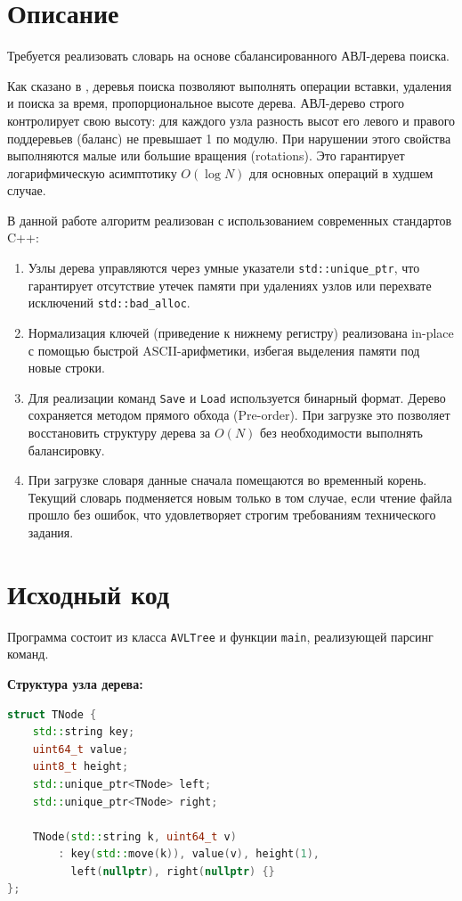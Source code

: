 \section{Описание}
Требуется реализовать словарь на основе сбалансированного АВЛ-дерева поиска. 

Как сказано в \cite{Kormen}, деревья поиска позволяют выполнять операции вставки, удаления и поиска за время, пропорциональное высоте дерева. АВЛ-дерево строго контролирует свою высоту: для каждого узла разность высот его левого и правого поддеревьев (баланс) не превышает 1 по модулю. При нарушении этого свойства выполняются малые или большие вращения (rotations). Это гарантирует логарифмическую асимптотику $O(\log N)$ для основных операций в худшем случае.

В данной работе алгоритм реализован с использованием современных стандартов C++:
\begin{enumerate}
\item Узлы дерева управляются через умные указатели \texttt{std::unique\_ptr}, что гарантирует отсутствие утечек памяти при удалениях узлов или перехвате исключений \texttt{std::bad\_alloc}.
\item Нормализация ключей (приведение к нижнему регистру) реализована in-place с помощью быстрой ASCII-арифметики, избегая выделения памяти под новые строки.
\item Для реализации команд \texttt{Save} и \texttt{Load} используется бинарный формат. Дерево сохраняется методом прямого обхода (Pre-order). При загрузке это позволяет восстановить структуру дерева за $O(N)$ без необходимости выполнять балансировку. 
\item При загрузке словаря данные сначала помещаются во временный корень. Текущий словарь подменяется новым только в том случае, если чтение файла прошло без ошибок, что удовлетворяет строгим требованиям технического задания.
\end{enumerate}

\section{Исходный код}
Программа состоит из класса \texttt{AVLTree} и функции \texttt{main}, реализующей парсинг команд.

\textbf{Структура узла дерева:}
\begin{lstlisting}[language=C++]
struct TNode {
    std::string key;
    uint64_t value;
    uint8_t height;
    std::unique_ptr<TNode> left;
    std::unique_ptr<TNode> right;

    TNode(std::string k, uint64_t v) 
        : key(std::move(k)), value(v), height(1), 
          left(nullptr), right(nullptr) {}
};
\end{lstlisting}

